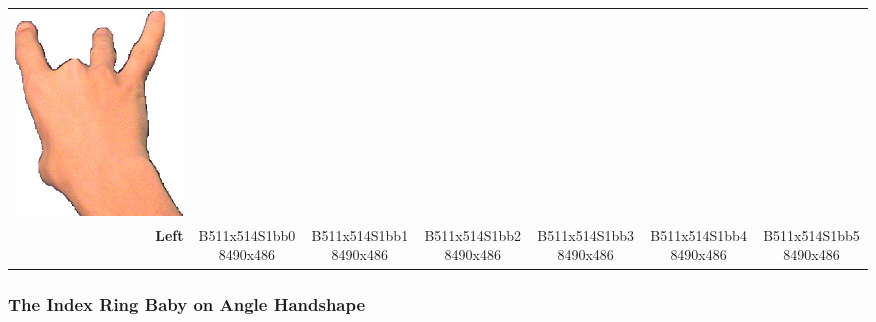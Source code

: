 \documentclass{article}
\begin{document}
\begin{center}
\begin{tabular}{r*{6}{c}}
\includegraphics[scale=0.1]{images/08-01-6.jpg}\\
\textbf{Left}&
B511x514S1bb08490x486&
B511x514S1bb18490x486&
B511x514S1bb28490x486&
B511x514S1bb38490x486&
B511x514S1bb48490x486&
B511x514S1bb58490x486\\
\end{tabular}
\end{center}

\subsubsection{The Index Ring Baby on Angle Handshape}
\end{document}
